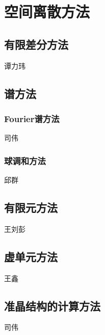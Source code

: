 \section{空间离散方法}

\subsection{有限差分方法}
{\color{red}\begin{center}
    谭力玮
\end{center}}

\subsection{谱方法}

\subsubsection{Fourier谱方法}
{\color{red}\begin{center}
     司伟
\end{center}}

\subsubsection{球调和方法}

{\color{red}\begin{center}
     邱群
\end{center}}

\subsection{有限元方法}

{\color{red}\begin{center}
     王刘彭
\end{center}}

\subsection{虚单元方法}
{\color{red}\begin{center}
    王鑫
\end{center}}

\subsection{准晶结构的计算方法}
{\color{red}\begin{center}
    司伟
\end{center}}
